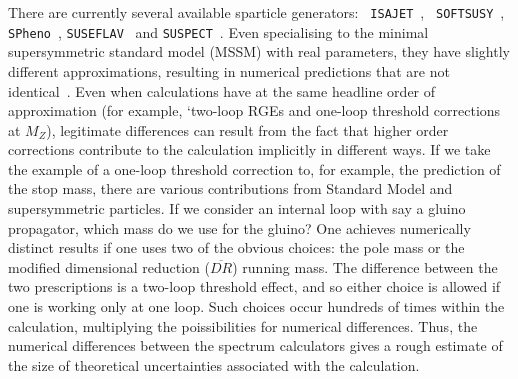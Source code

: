 \documentclass[final,3p,times,pdflatex]{elsarticle}
\begin{document}
There are currently several available sparticle generators: {\tt
  ISAJET}~\cite{Paige:2003mg}, {\tt 
  SOFTSUSY}~\cite{Allanach:2001kg,Allanach:2009bv,Allanach:2011de,Allanach:2013kza}, 
{\tt SPheno}~\cite{Porod:2003um},
{\tt SUSEFLAV}~\cite{Chowdhury:2011zr} and
{\tt SUSPECT}~\cite{Djouadi:2002ze}. Even specialising to the minimal
supersymmetric standard model (MSSM) with real parameters, 
they have slightly different
approximations, resulting in numerical predictions that are not
identical~\cite{Allanach:2003jw,Allanach:2004rh,Belanger:2005jk}. 
Even when calculations have at the same headline order of approximation (for
example, `two-loop RGEs and one-loop threshold corrections at $M_Z$),
legitimate differences can result from the fact that higher order corrections
contribute to the calculation implicitly in different ways. 
If we take the example of a one-loop threshold correction to, for example, 
the prediction of the stop mass, there are various contributions from Standard
Model and supersymmetric particles. If we consider an internal loop with
say a gluino propagator, which mass do we use for the gluino? One achieves
numerically distinct results if one uses two of the obvious choices: the
pole mass or the modified dimensional reduction ($\overline{DR}$) running
mass. The difference between the two prescriptions is a two-loop threshold
effect, and so either choice is allowed if one is working only at one loop.
Such choices occur hundreds of times within the calculation, multiplying the
poissibilities for numerical differences. Thus, the numerical differences
between the spectrum calculators gives a rough estimate of the size of
theoretical uncertainties associated with the calculation. 
\end{document}
